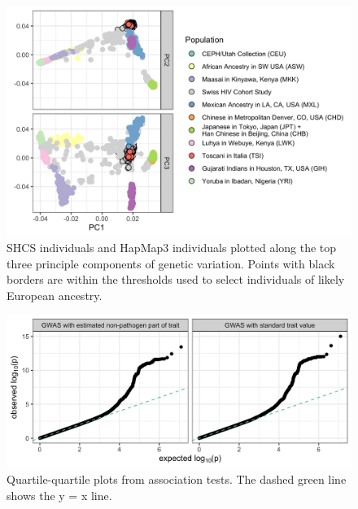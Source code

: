 \documentclass[]{article}
\begin{document}
\begin{doublespace}
\begin{figure}[H]
	\includegraphics[width=\linewidth]{figures/host_genotype_pca.png}
	\caption{SHCS individuals and HapMap3 individuals plotted along the top three principle components of genetic variation. Points with black borders are within the thresholds used to select individuals of likely European ancestry.}
	\label{fig:PCA}
\end{figure}

\begin{figure}[H]
	\centering
	\includegraphics[width=\linewidth]{figures/qq_plots.png}
	\caption{Quartile-quartile plots from association tests. The dashed green line shows the y = x line.}
	\label{fig:qq-plots}
\end{figure}

\end{doublespace}  %

\newpage
\end{document}
